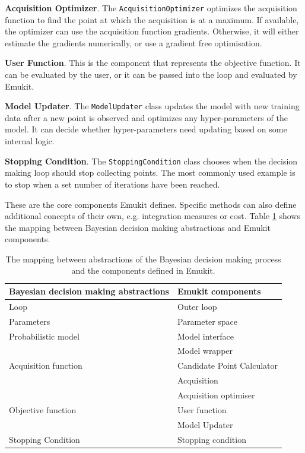 \textbf{Acquisition Optimizer}. The \texttt{AcquisitionOptimizer} optimizes the acquisition function to find the point at which the acquisition is at a maximum. If available, the optimizer can use the acquisition function gradients. Otherwise, it will either estimate the gradients numerically, or use a gradient free optimisation.

\textbf{User Function}. This is the component that represents the objective function. It can be evaluated by the user, or it can be passed into the loop and evaluated by Emukit.

\textbf{Model Updater}. The \texttt{ModelUpdater} class updates the model with new training data after a new point is observed and optimizes any hyper-parameters of the model. It can decide whether hyper-parameters need updating based on some internal logic.

\textbf{Stopping Condition}. The \texttt{StoppingCondition} class chooses when the decision making loop should stop collecting points. The most commonly used example is to stop when a set number of iterations have been reached.

These are the core components Emukit defines. Specific methods can also define additional concepts of their own, e.g. integration measures or cost. Table \ref{table:abstraction_mapping} shows the mapping between Bayesian decision making abstractions and Emukit components.

\begin{table}
    \setlength{\DUtablewidth}{\tablewidth}
    \begin{longtable}[c]{p{0.4\DUtablewidth}p{0.4\DUtablewidth}}
        \toprule
        \textbf{Bayesian decision making abstractions} & \textbf{Emukit components} \\
        \midrule
        \endfirsthead
        Loop & Outer loop \\
        \midrule
        Parameters & Parameter space \\
        Probabilistic model & Model interface \\
        & Model wrapper \\
        \midrule
        Acquisition function & Candidate Point Calculator \\
        & Acquisition \\
        & Acquisition optimiser \\
        \midrule
        Objective function & User function \\
        & Model Updater \\
        \midrule
        Stopping Condition & Stopping condition \\
        \bottomrule
    \end{longtable}
    \caption{The mapping between abstractions of the Bayesian decision making process and the components defined in Emukit.}
    \label{table:abstraction_mapping}
\end{table}

